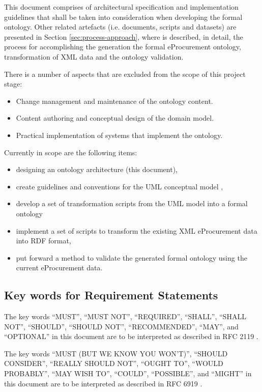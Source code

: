 	This document comprises of architectural specification and implementation guidelines that shall be taken into consideration when developing the formal ontology. Other related artefacts (i.e. documents, scripts and datasets) are presented in Section \ref{sec:process-approach}, where is described, in detail, the process for accomplishing the generation the formal eProcurement ontology, transformation of XML data and the ontology validation.
	
	There is a number of aspects that are excluded from the scope of this project stage:	
	\begin{itemize}
		\item Change management and maintenance of the ontology content.
		\item Content authoring and conceptual design of the domain model.
		\item Practical implementation of systems that implement the ontology.
	\end{itemize}
	
	Currently in scope are the following items:
	\begin{itemize}
		\item designing an ontology architecture (this document),
		\item create guidelines and conventions for the UML conceptual model \citep{costetchi2020b}, 
		\item develop a set of transformation scripts from the UML model into a formal ontology
		\item implement a set of scripts to transform the existing XML eProcurement data into RDF format,
		\item put forward a method to validate the generated formal ontology using the current eProcurement data.
	\end{itemize}

	\subsection{Key words for Requirement Statements}
	\label{sec:keywords}
	The key words ``MUST'', ``MUST NOT'', ``REQUIRED'', ``SHALL'', ``SHALL  NOT'', ``SHOULD'', ``SHOULD NOT'', ``RECOMMENDED'',  ``MAY'', and ``OPTIONAL'' in this document are to be interpreted as described in RFC 2119 \cite{rfc2119}.

	The key words ``MUST (BUT WE KNOW YOU WON'T)'', ``SHOULD CONSIDER'', ``REALLY SHOULD NOT'', ``OUGHT TO'', ``WOULD PROBABLY'', ``MAY WISH TO'', ``COULD'', ``POSSIBLE'', and ``MIGHT'' in this document are to be interpreted as described in RFC 6919 \cite{rfc6919}.